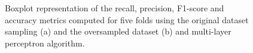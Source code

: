 \begin{figure}[H]
\centering
  \qquad
\caption{Boxplot representation of the recall, precision, F1-score and accuracy metrics computed for five folds using the original dataset sampling (a) and the oversampled dataset (b) and multi-layer perceptron algorithm.}
\label{figure_metrics_MLP}
\end{figure}

